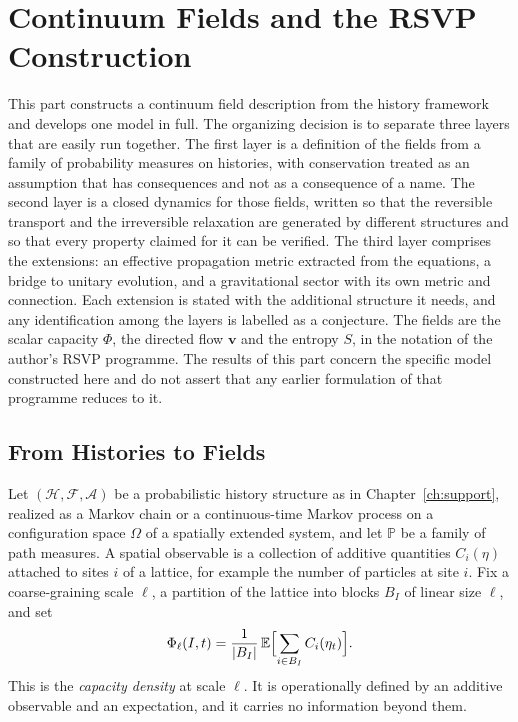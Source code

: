 \documentclass[11pt,oneside]{book}
\theoremstyle{definition}
\theoremstyle{remark}
\newcommand{\Hist}{\mathcal{H}}
\newcommand{\Fut}{\mathcal{F}}
\newcommand{\Adm}{\mathcal{A}}
\begin{document}
\part{Continuum Fields and the RSVP Construction}

This part constructs a continuum field description from the history framework and develops one model in full. The organizing decision is to separate three layers that are easily run together. The first layer is a definition of the fields from a family of probability measures on histories, with conservation treated as an assumption that has consequences and not as a consequence of a name. The second layer is a closed dynamics for those fields, written so that the reversible transport and the irreversible relaxation are generated by different structures and so that every property claimed for it can be verified. The third layer comprises the extensions: an effective propagation metric extracted from the equations, a bridge to unitary evolution, and a gravitational sector with its own metric and connection. Each extension is stated with the additional structure it needs, and any identification among the layers is labelled as a conjecture. The fields are the scalar capacity $\Phi$, the directed flow $\mathbf v$ and the entropy $S$, in the notation of the author's RSVP programme. The results of this part concern the specific model constructed here and do not assert that any earlier formulation of that programme reduces to it.

\chapter{From Histories to Fields}\label{ch:h2f}

Let $(\Hist,\Fut,\Adm)$ be a probabilistic history structure as in Chapter~\ref{ch:support}, realized as a Markov chain or a continuous-time Markov process on a configuration space $\Omega$ of a spatially extended system, and let $\mathbb P$ be a family of path measures. A spatial observable is a collection of additive quantities $C_i(\eta)$ attached to sites $i$ of a lattice, for example the number of particles at site $i$. Fix a coarse-graining scale $\ell$, a partition of the lattice into blocks $B_I$ of linear size $\ell$, and set
\[
\Phi_\ell(I,t)=\frac1{|B_I|}\,\mathbb E\Bigl[\sum_{i\in B_I}C_i(\eta_t)\Bigr].
\]
This is the \emph{capacity density} at scale $\ell$. It is operationally defined by an additive observable and an expectation, and it carries no information beyond them.
\end{document}
